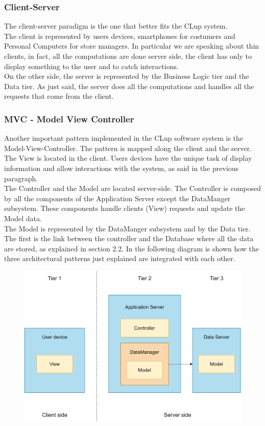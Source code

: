\documentclass[]{article}
\begin{document}
	\subsubsection{Client-Server}
	The client-server paradigm is the one that better fits the CLup system.
	\\The client is represented by users devices, smartphones for costumers and Personal Computers for store managers. In particular we are speaking about thin clients, in fact, all the computations are done server side, the client has only to display something to the user and to catch interactions.
	\\On the other side, the server is represented by the Business Logic tier and the Data tier. As just said, the server does all the computations and handles all the requests that come from the client. 
	
	\subsubsection{MVC - Model View Controller}
	Another important pattern implemented in the CLup software system is the Model-View-Controller.
	The pattern is mapped along the client and the server. 
	The View is located in the client. Users devices have the unique task of display information and allow interactions with the system, as said in the previous paragraph.
	\\The Controller and the Model are located server-side.
	The Controller is composed by all the components of the Application Server except the DataManger subsystem. These components handle clients (View) requests and update the Model data. 
	\\The Model is represented by the DataManger subsystem and by the Data tier. The first is the link between the controller and the Database where all the data are stored, as explained in section 2.2.
	\newline
	\newline
	\newline
	In the following diagram is shown how the three architectural patterns just explained are integrated with each other.
	\bigskip
	\begin{figure}[H]
		\centering
		\includegraphics[scale=0.8]{MVC}
		\caption{}
	\end{figure}
	
\end{document}
